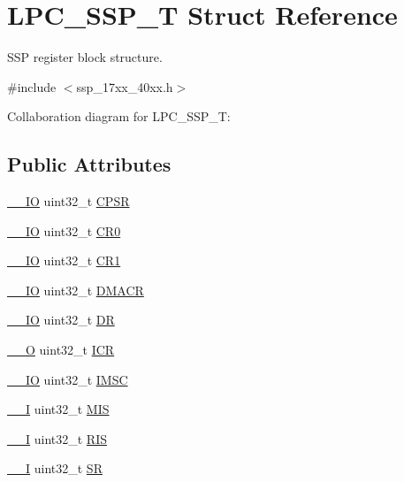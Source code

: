 \hypertarget{structLPC__SSP__T}{}\section{L\+P\+C\+\_\+\+S\+S\+P\+\_\+T Struct Reference}
\label{structLPC__SSP__T}


S\+SP register block structure.  




{\ttfamily \#include $<$ssp\+\_\+17xx\+\_\+40xx.\+h$>$}



Collaboration diagram for L\+P\+C\+\_\+\+S\+S\+P\+\_\+T\+:
\subsection*{Public Attributes}
\begin{DoxyCompactItemize}
\item 
\hyperlink{core__cm3_8h_aec43007d9998a0a0e01faede4133d6be}{\+\_\+\+\_\+\+IO} uint32\+\_\+t \hyperlink{structLPC__SSP__T_a48e7161fc6e6b91bd724a17df5435141}{C\+P\+SR}
\item 
\hyperlink{core__cm3_8h_aec43007d9998a0a0e01faede4133d6be}{\+\_\+\+\_\+\+IO} uint32\+\_\+t \hyperlink{structLPC__SSP__T_af8ad155254cb659608f4c1c6bd83b62b}{C\+R0}
\item 
\hyperlink{core__cm3_8h_aec43007d9998a0a0e01faede4133d6be}{\+\_\+\+\_\+\+IO} uint32\+\_\+t \hyperlink{structLPC__SSP__T_a648b740833659e86e8be3a8f6c17147c}{C\+R1}
\item 
\hyperlink{core__cm3_8h_aec43007d9998a0a0e01faede4133d6be}{\+\_\+\+\_\+\+IO} uint32\+\_\+t \hyperlink{structLPC__SSP__T_a6a74b0cbac37f424e198ccef9a208d65}{D\+M\+A\+CR}
\item 
\hyperlink{core__cm3_8h_aec43007d9998a0a0e01faede4133d6be}{\+\_\+\+\_\+\+IO} uint32\+\_\+t \hyperlink{structLPC__SSP__T_a7a32964f3ca72981b80cf4012c515ea8}{DR}
\item 
\hyperlink{core__cm3_8h_a7e25d9380f9ef903923964322e71f2f6}{\+\_\+\+\_\+O} uint32\+\_\+t \hyperlink{structLPC__SSP__T_ad788fb9f7178c7a79588b429f74b9946}{I\+CR}
\item 
\hyperlink{core__cm3_8h_aec43007d9998a0a0e01faede4133d6be}{\+\_\+\+\_\+\+IO} uint32\+\_\+t \hyperlink{structLPC__SSP__T_a5969572eaab7a02f4bbd7c898f93ca73}{I\+M\+SC}
\item 
\hyperlink{core__cm3_8h_af63697ed9952cc71e1225efe205f6cd3}{\+\_\+\+\_\+I} uint32\+\_\+t \hyperlink{structLPC__SSP__T_aa4b72809de09f83335e72d0d0844a90b}{M\+IS}
\item 
\hyperlink{core__cm3_8h_af63697ed9952cc71e1225efe205f6cd3}{\+\_\+\+\_\+I} uint32\+\_\+t \hyperlink{structLPC__SSP__T_a0aa742f8d7d4b2e2a6038b01dbc1aa5b}{R\+IS}
\item 
\hyperlink{core__cm3_8h_af63697ed9952cc71e1225efe205f6cd3}{\+\_\+\+\_\+I} uint32\+\_\+t \hyperlink{structLPC__SSP__T_a5f6421682b9a321abc8d4c91a6dbd964}{SR}
\end{DoxyCompactItemize}


